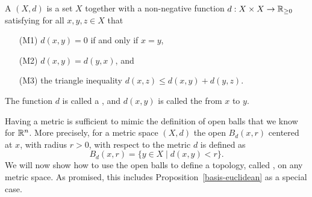 \begin{defn}
  A  $(X,d)$ is a set $X$ together with a non-negative function $d : X \times X \to \mathbb{R}_{\geq 0}$ satisfying for all $x,y,z \in X$ that
  \begin{enumerate}
    \item[(M1)] $d(x,y) = 0$ if and only if $x = y$,
    \item[(M2)] $d(x,y) = d(y,x)$, and
    \item[(M3)] the triangle inequality $d(x,z) \leq d(x,y) + d(y,z)$.
  \end{enumerate}
  The function $d$ is called a , and $d(x,y)$ is called the  from $x$ to $y$.
\end{defn}
Having a metric is sufficient to mimic the definition of open balls that we know for $\mathbb{R}^n$. More precisely, for a metric space $(X,d)$ the open  $B_d(x,r)$ centered at $x$, with radius $r > 0$, with respect to the metric $d$ is defined as
\[
  B_d(x,r) = \{ y \in X \mid d(x,y) < r \}.
\]
We will now show how to use the open balls to define a topology, called , on any metric space. As promised, this includes Proposition~\ref{basis-euclidean} as a special case.

